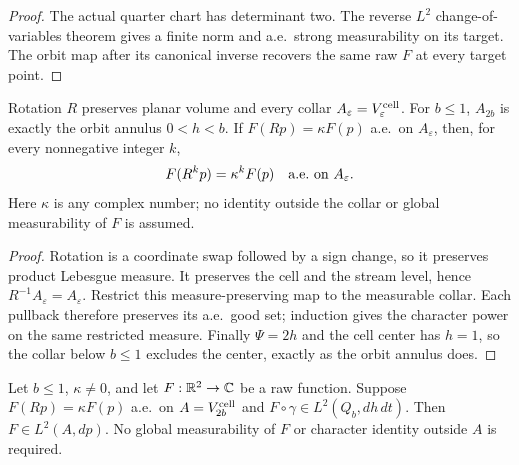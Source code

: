 \begin{proof}
\leanok
The actual quarter chart has determinant two.
The reverse $L^2$ change-of-variables theorem gives a finite norm
and a.e.\ strong measurability on its target.
The orbit map after its canonical inverse recovers the same raw $F$
at every target point.
\end{proof}

\begin{lemma}
\label{lem:collar-rotation-character}
\leanok
Rotation $R$ preserves planar volume and every collar
$A_\varepsilon=V_\varepsilon^{\rm cell}$.
For $b\le1$, $A_{2b}$ is exactly the orbit annulus $0<h<b$.
If $F(Rp)=\kappa F(p)$ a.e.\ on $A_\varepsilon$, then, for every
nonnegative integer $k$,
\[
 F(R^kp)=\kappa^kF(p)\quad\hbox{a.e.\ on }A_\varepsilon.
\]
Here $\kappa$ is any complex number; no identity outside the collar
or global measurability of $F$ is assumed.
\end{lemma}

\begin{proof}
\leanok
Rotation is a coordinate swap followed by a sign change, so it
preserves product Lebesgue measure. It preserves the cell and the
stream level, hence $R^{-1}A_\varepsilon=A_\varepsilon$.
Restrict this measure-preserving map to the measurable collar.
Each pullback therefore preserves its a.e.\ good set; induction gives
the character power on the same restricted measure.
Finally $\Psi=2h$ and the cell center has $h=1$, so the collar below
$b\le1$ excludes the center, exactly as the orbit annulus does.
\end{proof}

\begin{lemma}
\label{lem:quarter-character-cell-mass}
\leanok
Let $b\le1$, $\kappa\ne0$, and let $F:\mathbb{R}^2\to\mathbb{C}$ be a raw function.
Suppose $F(Rp)=\kappa F(p)$ a.e.\ on $A=V_{2b}^{\rm cell}$ and
$F\circ\gamma\in L^2(Q_b,dh\,dt)$.
Then $F\in L^2(A,dp)$.
No global measurability of $F$ or character identity outside $A$
is required.
\end{lemma}

